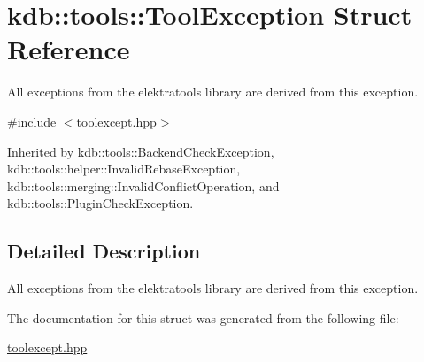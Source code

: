 \hypertarget{structkdb_1_1tools_1_1ToolException}{\section{kdb\-:\-:tools\-:\-:Tool\-Exception Struct Reference}
\label{structkdb_1_1tools_1_1ToolException}
}


All exceptions from the elektratools library are derived from this exception.  




{\ttfamily \#include $<$toolexcept.\-hpp$>$}



Inherited by kdb\-::tools\-::\-Backend\-Check\-Exception, kdb\-::tools\-::helper\-::\-Invalid\-Rebase\-Exception, kdb\-::tools\-::merging\-::\-Invalid\-Conflict\-Operation, and kdb\-::tools\-::\-Plugin\-Check\-Exception.



\subsection{Detailed Description}
All exceptions from the elektratools library are derived from this exception. 

The documentation for this struct was generated from the following file\-:\begin{DoxyCompactItemize}
\item 
\hyperlink{toolexcept_8hpp}{toolexcept.\-hpp}\end{DoxyCompactItemize}
